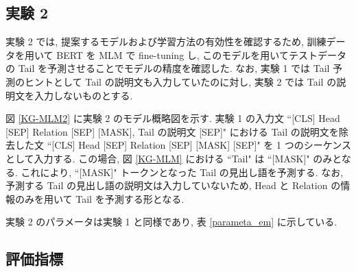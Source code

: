 \subsection{実験 2}

実験 2 では, 提案するモデルおよび学習方法の有効性を確認するため, 訓練データを用いて BERT を MLM で fine-tuning し, このモデルを用いてテストデータの Tail を予測させることでモデルの精度を確認した. なお, 実験 1 では Tail 予測のヒントとして Tail の説明文も入力していたのに対し, 実験 2 では Tail の説明文を入力しないものとする. \par
図 \ref{KG-MLM2} に実験 2 のモデル概略図を示す. 実験 1 の入力文 ``[CLS] Head [SEP] Relation [SEP] [MASK], Tail の説明文 [SEP]" における Tail の説明文を除去した文 ``[CLS] Head [SEP] Relation [SEP] [MASK] [SEP]" を 1 つのシーケンスとして入力する. この場合, 図 \ref{KG-MLM} における ``Tail" は ``[MASK]" のみとなる. これにより, ``[MASK]" トークンとなった Tail の見出し語を予測する. なお, 予測する Tail の見出し語の説明文は入力していないため, Head と Relation の情報のみを用いて Tail を予測する形となる. \par
実験 2 のパラメータは実験 1 と同様であり, 表 \ref{parameta_em} に示している. \par

\subsection{評価指標}

